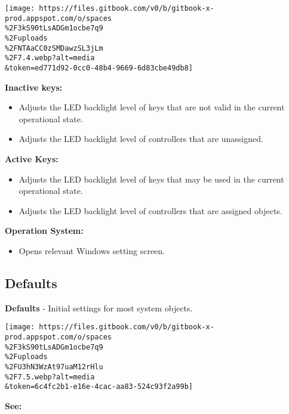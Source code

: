 \documentclass[
]{article}
\providecommand{\tightlist}{%
  \setlength{\itemsep}{0pt}\setlength{\parskip}{0pt}}
\begin{document}
\texttt{[image: https://files.gitbook.com/v0/b/gitbook-x-prod.appspot.com/o/spaces\\\%2F3kS90tLsADGm1ocbe7q9\\\%2Fuploads\\\%2FNTAaCC0zSMDawzSL3jLm\\\%2F7.4.webp?alt=media\\\&token=ed771d92-0cc0-48b4-9669-6d83cbe49db8]}

\textbf{Inactive keys:}

\begin{itemize}
\item
  Adjusts the LED backlight level of keys that are not valid in the current operational state.
\item
  Adjusts the LED backlight level of controllers that are unassigned.
\end{itemize}

\textbf{Active Keys:}

\begin{itemize}
\item
  Adjusts the LED backlight level of keys that may be used in the current operational state.
\item
  Adjusts the LED backlight level of controllers that are assigned objects.
\end{itemize}

\textbf{Operation System:}

\begin{itemize}
\tightlist
\item
  Opens relevant Windows setting screen.
\end{itemize}

\hypertarget{defaults}{%
\subsection{Defaults}\label{defaults}}

\textbf{Defaults} - Initial settings for most system objects.

\texttt{[image: https://files.gitbook.com/v0/b/gitbook-x-prod.appspot.com/o/spaces\\\%2F3kS90tLsADGm1ocbe7q9\\\%2Fuploads\\\%2FU3hN3WzAt97uaM12rHlu\\\%2F7.5.webp?alt=media\\\&token=6c4fc2b1-e16e-4cac-aa83-524c93f2a99b]}

\textbf{See:}
\end{document}
